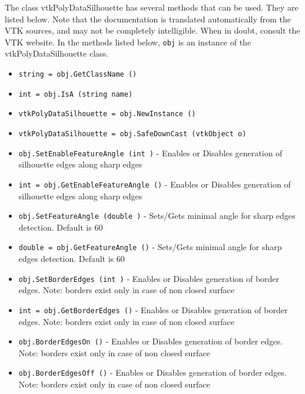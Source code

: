 The class vtkPolyDataSilhouette has several methods that can be used.
  They are listed below.
Note that the documentation is translated automatically from the VTK sources,
and may not be completely intelligible.  When in doubt, consult the VTK website.
In the methods listed below, \verb|obj| is an instance of the vtkPolyDataSilhouette class.
\begin{itemize}
\item  \verb|string = obj.GetClassName ()|

\item  \verb|int = obj.IsA (string name)|

\item  \verb|vtkPolyDataSilhouette = obj.NewInstance ()|

\item  \verb|vtkPolyDataSilhouette = obj.SafeDownCast (vtkObject o)|

\item  \verb|obj.SetEnableFeatureAngle (int )| -  Enables or Disables generation of silhouette edges along sharp edges

\item  \verb|int = obj.GetEnableFeatureAngle ()| -  Enables or Disables generation of silhouette edges along sharp edges

\item  \verb|obj.SetFeatureAngle (double )| -  Sets/Gets minimal angle for sharp edges detection. Default is 60

\item  \verb|double = obj.GetFeatureAngle ()| -  Sets/Gets minimal angle for sharp edges detection. Default is 60

\item  \verb|obj.SetBorderEdges (int )| -  Enables or Disables generation of border edges. Note: borders exist only
 in case of non closed surface

\item  \verb|int = obj.GetBorderEdges ()| -  Enables or Disables generation of border edges. Note: borders exist only
 in case of non closed surface

\item  \verb|obj.BorderEdgesOn ()| -  Enables or Disables generation of border edges. Note: borders exist only
 in case of non closed surface

\item  \verb|obj.BorderEdgesOff ()| -  Enables or Disables generation of border edges. Note: borders exist only
 in case of non closed surface


\end{itemize}
